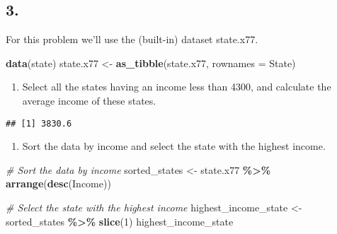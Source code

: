 \documentclass[
]{article}
\newenvironment{Shaded}{\begin{snugshade}}{\end{snugshade}}
\newcommand{\AttributeTok}[1]{\textcolor[rgb]{0.13,0.29,0.53}{#1}}
\newcommand{\CommentTok}[1]{\textcolor[rgb]{0.56,0.35,0.01}{\textit{#1}}}
\newcommand{\DecValTok}[1]{\textcolor[rgb]{0.00,0.00,0.81}{#1}}
\newcommand{\FunctionTok}[1]{\textcolor[rgb]{0.13,0.29,0.53}{\textbf{#1}}}
\newcommand{\NormalTok}[1]{#1}
\newcommand{\OtherTok}[1]{\textcolor[rgb]{0.56,0.35,0.01}{#1}}
\newcommand{\SpecialCharTok}[1]{\textcolor[rgb]{0.81,0.36,0.00}{\textbf{#1}}}
\newcommand{\StringTok}[1]{\textcolor[rgb]{0.31,0.60,0.02}{#1}}
\providecommand{\tightlist}{%
  \setlength{\itemsep}{0pt}\setlength{\parskip}{0pt}}
\begin{document}
\subsection{3.}\label{section-2}

For this problem we'll use the (built-in) dataset state.x77.

\begin{Shaded}
\begin{Highlighting}[]
\FunctionTok{data}\NormalTok{(state)}
\NormalTok{state.x77 }\OtherTok{\textless{}{-}} \FunctionTok{as\_tibble}\NormalTok{(state.x77, }\AttributeTok{rownames  =} \StringTok{\textquotesingle{}State\textquotesingle{}}\NormalTok{)}
\end{Highlighting}
\end{Shaded}

\begin{enumerate}
\def\labelenumi{\alph{enumi}.}
\tightlist
\item
  Select all the states having an income less than 4300, and calculate
  the average income of these states.
\end{enumerate}

\begin{Shaded}
\end{Shaded}

\begin{verbatim}
## [1] 3830.6
\end{verbatim}

\begin{enumerate}
\def\labelenumi{\alph{enumi}.}
\setcounter{enumi}{1}
\tightlist
\item
  Sort the data by income and select the state with the highest income.
\end{enumerate}

\begin{Shaded}
\begin{Highlighting}[]
\CommentTok{\# Sort the data by income}
\NormalTok{sorted\_states }\OtherTok{\textless{}{-}}\NormalTok{ state.x77 }\SpecialCharTok{\%\textgreater{}\%} \FunctionTok{arrange}\NormalTok{(}\FunctionTok{desc}\NormalTok{(Income))}

\CommentTok{\# Select the state with the highest income}
\NormalTok{highest\_income\_state }\OtherTok{\textless{}{-}}\NormalTok{ sorted\_states }\SpecialCharTok{\%\textgreater{}\%} \FunctionTok{slice}\NormalTok{(}\DecValTok{1}\NormalTok{)}
\NormalTok{highest\_income\_state}
\end{Highlighting}
\end{Shaded}
\end{document}

